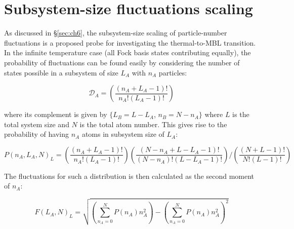 

\section{Subsystem-size fluctuations scaling}

As discussed in \S \ref{sec:ch6}, the subsystem-size scaling of particle-number fluctuations is a proposed probe for investigating the thermal-to-MBL transition. In the infinite temperature case (all Fock basis states contributing equally), the probability of fluctuations can be found easily by considering the number of states possible in a subsystem of size $L_A$ with $n_A$ particles:

\[
\mathcal{D}_A = \left ( \frac{(n_A + L_A - 1)!}{ n_A! (L_A -1)! } \right )
\] 

where its complement is given by $\{ L_B = L-L_A$, $n_B = N-n_A \}$ where $L$ is the total system size and $N$ is the total atom number. This gives rise to the probability of having $n_A$ atoms in subsystem size of $L_A$:

\[
P(n_A,L_A, N)_L = \left (\frac{(n_A + L_A - 1)!}{ n_A! (L_A -1)! } \right ) \left (\frac{(N-n_A + L- L_A - 1)!}{ (N-n_A)! (L-L_A -1)! } \right ) \Big / \left (\frac{(N+L- 1)!}{ N! (L -1)! } \right ) 
\]

The fluctuations for such a distribution is then calculated as the second moment of $n_A$:

\begin{equation}
F(L_A, N)_L = \sqrt{\left ( \sum_{n_A=0}^N P(n_A) n_A^2 \right ) - \left ( \sum_{n_A=0}^N P(n_A) n_A^2 \right )^2}
\end{equation}

